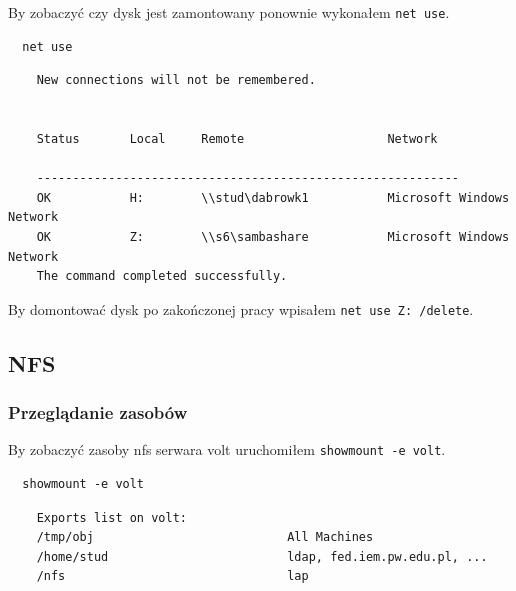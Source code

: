 \documentclass{article} %
\begin{document}
By zobaczyć czy dysk jest zamontowany ponownie wykonałem \texttt{net use}.
\begin{tcolorbox}[colback=yellow!10!white,colframe=red!45!black,coltitle=yellow!100!black, title=Windows]
  \begin{lstlisting}
  net use
  \end{lstlisting}
  \tcblower
  \footnotesize
  \begin{lstlisting}
    New connections will not be remembered.


    Status       Local     Remote                    Network
    
    -----------------------------------------------------------
    OK           H:        \\stud\dabrowk1           Microsoft Windows Network
    OK           Z:        \\s6\sambashare           Microsoft Windows Network
    The command completed successfully.
  \end{lstlisting}
\end{tcolorbox}
\normalsize
\vspace{5mm}

By domontować dysk po zakończonej pracy wpisałem \texttt{net use Z: /delete}.

\subsection{NFS}

\subsubsection{Przeglądanie zasobów}
By zobaczyć zasoby nfs serwara volt uruchomiłem \texttt{showmount -e volt}.
\begin{tcolorbox}[colback=yellow!10!white,colframe=red!45!black,coltitle=yellow!100!black, title=Windows]
  \begin{lstlisting}
  showmount -e volt
  \end{lstlisting}
  \tcblower
  \footnotesize
  \begin{lstlisting}
    Exports list on volt:
    /tmp/obj                           All Machines
    /home/stud                         ldap, fed.iem.pw.edu.pl, ...
    /nfs                               lap
  \end{lstlisting}
\end{tcolorbox}
\normalsize
\end{document}
